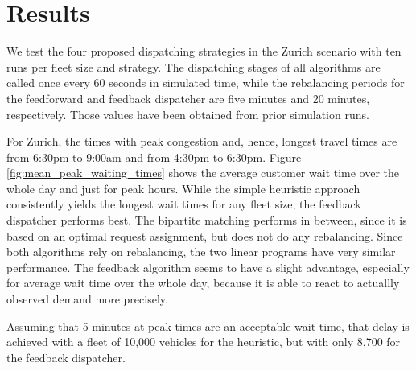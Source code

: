 \section{Results}
\label{sec:results}

We test the four proposed dispatching strategies in the Zurich scenario with ten
runs per fleet size and strategy.%
The dispatching stages of all algorithms are called once every 60 seconds in
simulated time, while the rebalancing periods for the feedforward and feedback
dispatcher are five minutes and 20 minutes, respectively. Those values have been
obtained from prior simulation runs.

For Zurich, the times with peak congestion and, hence, longest travel times
are from 6:30pm to 9:00am and from 4:30pm to 6:30pm. Figure \ref{fig:mean_peak_waiting_times}
shows the average customer wait time over the whole day and just for peak hours.
While the simple heuristic approach consistently yields the longest wait times
for any fleet size, the feedback dispatcher performs best. The bipartite matching
performs in between, since it is based on an optimal request assignment, but does
not do any rebalancing. Since both algorithms rely on rebalancing, the two linear
programs have very similar performance. The feedback algorithm seems to have a
slight advantage, especially for average wait time over the whole day, because it
is able to react to actuallly observed demand more precisely.

Assuming that 5 minutes at peak times are an acceptable wait time, that delay is
achieved with a fleet of 10,000 vehicles for the heuristic, but with only 8,700
for the feedback dispatcher.

\captionsetup[subfigure]{width=0.9\textwidth}

